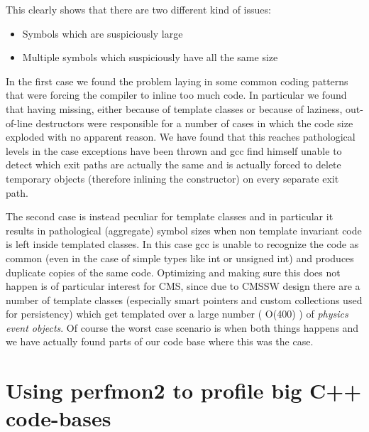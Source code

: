 \documentclass[a4paper]{jpconf}
\begin{document}
This clearly shows that there are two different kind of issues:


\begin{itemize}


\item Symbols which are suspiciously large

\item Multiple symbols which suspiciously have all the same size
\end{itemize}

In the first case we found the problem laying in some common coding patterns that were forcing the compiler to inline too much code. In particular we found that having missing, either because of template classes or because of laziness, out-of-line destructors were responsible for a number of cases in which the code size exploded with no apparent reason. We have found that this reaches pathological levels in the case exceptions have been thrown and gcc find himself unable to detect which exit paths are actually the same and is actually forced to delete temporary objects (therefore inlining the constructor) on every separate exit path.


The second case is instead peculiar for template classes and in particular it results in pathological (aggregate) symbol sizes when non template invariant code is left inside templated classes. In this case gcc is unable to recognize the code as common (even in the case of simple types like int or unsigned int) and produces duplicate copies of the same code. Optimizing and making sure this does not happen is of particular interest for CMS, since due to CMSSW design there are a number of template classes (especially smart pointers and custom collections used for persistency) which get templated over a large number ( O(400) ) of {\itshape physics event objects}. Of course the worst case scenario is when both things happens and we have actually found parts of our code base where this was the case.


\section{Using perfmon2 to profile big C++ code-bases}
\label{usingperfmon2toprofilebigccode-bases}
\end{document}
